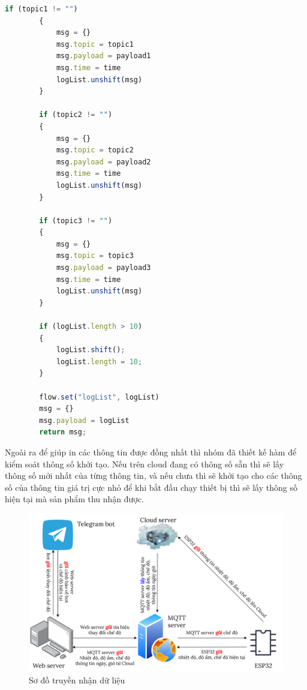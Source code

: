 \documentclass{report}
\begin{document}
\begin{enumerate}
\begin{lstlisting}[language=JavaScript, caption={function of control log list}]
        if (topic1 != "")
        {
            msg = {}
            msg.topic = topic1
            msg.payload = payload1
            msg.time = time
            logList.unshift(msg)
        }

        if (topic2 != "") 
        {
            msg = {}
            msg.topic = topic2
            msg.payload = payload2
            msg.time = time
            logList.unshift(msg)
        }

        if (topic3 != "") 
        {
            msg = {}
            msg.topic = topic3
            msg.payload = payload3
            msg.time = time
            logList.unshift(msg)
        }

        if (logList.length > 10) 
        {
            logList.shift();
            logList.length = 10;
        }

        flow.set("logList", logList)
        msg = {}
        msg.payload = logList
        return msg;
    \end{lstlisting}

    Ngoài ra để  giúp in các thông tin được đồng nhất thì nhóm đã thiết kế  hàm để kiểm soát thông số  khởi tạo. Nếu trên cloud đang có thông số sẵn thì sẽ lấy thông số mới nhất của từng thông tin, và nếu chưa thì sẽ khởi tạo cho các thông số của thông tin giá trị cực nhỏ để khi bắt đầu chạy thiết bị thì sẽ lấy thông số  hiện tại mà sản phẩm thu nhận được.
\end{enumerate}

\begin{figure}
    \centering
    \includegraphics[width=\textwidth]{img/Diagram.png}
    \caption{Sơ đồ  truyền nhận dữ liệu}
\end{figure}

\newpage
\end{document}
